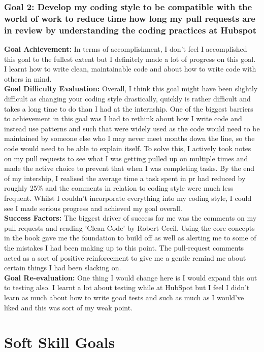 \subsubsection*{Goal 2: Develop my coding style to be compatible with the world of work to reduce time how long my pull requests are in review by understanding the coding practices at Hubspot}
\textbf{Goal Achievement: } In terms of accomplishment,  I don't feel I accomplished this goal to the fullest extent but I definitely made a lot of progress on this goal.  I learnt how to write clean,  maintainable code and about how to write code with others in mind. \\
\textbf{Goal Difficulty Evaluation:}  Overall,  I think this goal might have been slightly difficult as changing your coding style drastically, quickly is rather difficult and takes a long time to do than I had at the internship.  One of the biggest barriers to achievement in this goal was I had to rethink about how I write code and instead use patterns and such that were widely used as the code would need to be maintained by someone else who I may never meet months down the line,  so the code would need to be able to explain itself.  To solve this,  I actively took notes on my pull requests to see what I was getting pulled up on multiple times and made the active choice to prevent that when I was completing tasks.  By the end of my intership,  I realised the average time a task spent in pr had reduced by roughly 25\% and the comments in relation to coding style were much less frequent.  Whilst I couldn't incorporate everything into my coding style,  I could see I made serious progress and achieved my goal overall.\\
\textbf{Success Factors:} The biggest driver of success for me was the comments on my pull requests and reading 'Clean Code' by Robert Cecil. Using the core concepts in the book gave me the foundation to build off as well as alerting me to some of the mistakes I had been making up to this point.  The pull-request comments acted as a sort of positive reinforcement to give me a gentle remind me about certain things I had been slacking on. \\
\textbf{Goal Re-evaluation:} One thing I would change here is I would expand this out to testing also.  I learnt a lot about testing while at HubSpot but I feel I didn't learn as much about how to write good tests and such as much as I would've liked and this was sort of my weak point. 


\section{Soft Skill Goals}
